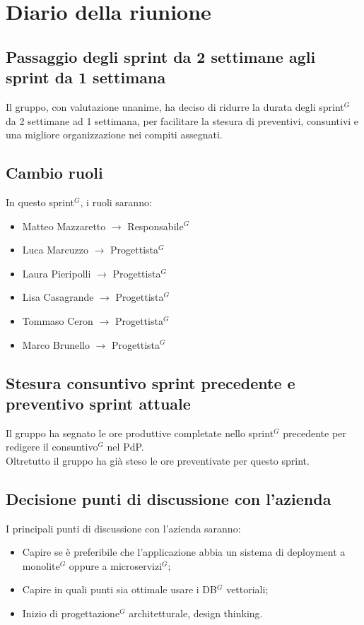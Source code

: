 \section{Diario della riunione}
\subsection{Passaggio degli sprint da 2 settimane agli sprint da 1 settimana}
Il gruppo, con valutazione unanime, ha deciso di ridurre la durata degli sprint$^G$ da 2 settimane ad 1 settimana, per facilitare la stesura di preventivi, consuntivi e una migliore organizzazione nei compiti assegnati.

\subsection{Cambio ruoli}
In questo sprint$^G$, i ruoli saranno:
\begin{itemize}
	\item Matteo Mazzaretto $\rightarrow$ Responsabile$^G$
	\item Luca Marcuzzo $\rightarrow$ Progettista$^G$
	\item Laura Pieripolli $\rightarrow$ Progettista$^G$
	\item Lisa Casagrande $\rightarrow$ Progettista$^G$
	\item Tommaso Ceron $\rightarrow$ Progettista$^G$
	\item Marco Brunello $\rightarrow$ Progettista$^G$
\end{itemize}


\subsection{Stesura consuntivo sprint precedente e preventivo sprint attuale}
Il gruppo ha segnato le ore produttive completate nello sprint$^G$ precedente per redigere il consuntivo$^G$ nel PdP.\\
Oltretutto il gruppo ha già steso le ore preventivate per questo sprint.

\subsection{Decisione punti di discussione con l'azienda}
I principali punti di discussione con l'azienda saranno:
\begin{itemize}
	\item Capire se è preferibile che l'applicazione abbia un sistema di deployment a monolite$^G$ oppure a microservizi$^G$;
	\item Capire in quali punti sia ottimale usare i DB$^G$ vettoriali;
	\item Inizio di progettazione$^G$ architetturale, design thinking.
\end{itemize}

